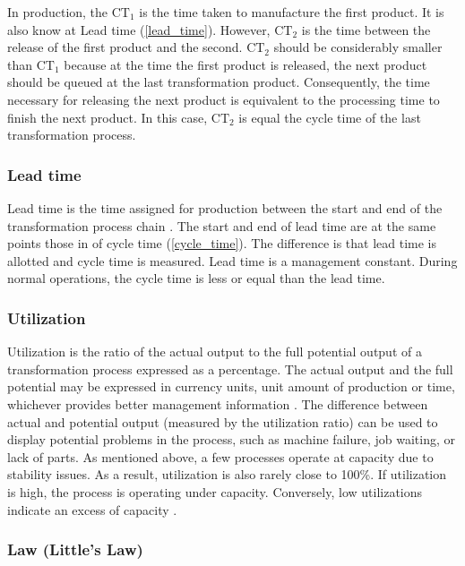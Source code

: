 \documentclass{article}
\begin{document}
In production, the \(\mbox{CT}_1\) is the time taken to manufacture the first product.
It is also know at Lead time (\ref{lead_time}).
However, \(\mbox{CT}_2\) is the time between the release of the first product and the second.
 \(\mbox{CT}_2\) should be considerably smaller than \(\mbox{CT}_1\) because at the time the first product is released, the next product should be queued at the last transformation product.
Consequently, the time necessary for releasing the next product is equivalent to the processing time to finish the next product.
In this case, \(\mbox{CT}_2\) is equal the cycle time of the last transformation process.

\subsubsection{Lead time \label{lead_time}}
\label{sec:org99fb102}

Lead time is the time assigned for production between the start and end of the transformation process chain \citep{Hopp2001}.
The start and end of lead time are at the same points those in of cycle time (\ref{cycle_time}).
The difference is that lead time is allotted and cycle time is measured.
Lead time is a management constant.
During normal operations, the cycle time is less or equal than the lead time.

\subsubsection{Utilization \label{utilization}}
\label{sec:org596cf74}

Utilization is the ratio of the actual output to the full potential output of a transformation process expressed as a percentage.
The actual output and the full potential may be expressed in currency units, unit amount of production or time, whichever provides better management information \citep{Kumar2009}.
The difference between actual and potential output (measured by the utilization ratio) can be used to display potential problems in the process, such as machine failure, job waiting, or lack of parts.
As mentioned above, a few processes operate at capacity due to stability issues.
As a result, utilization is also rarely close to 100\%.
If utilization is high, the process is operating under capacity.
Conversely, low utilizations indicate an excess of capacity \citep{Hopp2001}.

\subsubsection{Law (Little's Law) \label{littles_law}}
\label{sec:org3b3f00c}
\end{document}
